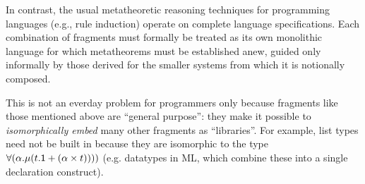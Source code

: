 \documentclass[10pt,preprint]{sigplanconf}
\begin{document}
In contrast, the usual metatheoretic reasoning techniques for programming languages  (e.g., rule induction) operate on complete language specifications. Each {combination} of fragments must formally be treated as its own monolithic language for which  metatheorems must be established anew, guided only informally by those derived for the smaller systems from which it is notionally composed.


This is not an everday problem for programmers only because fragments like those mentioned above are ``general purpose'': they make it possible to \emph{isomorphically embed}  many other fragments as ``libraries''. For example, list types need not be built in because they are isomorphic to the type $\forall(\alpha.\mu(t.{\sf 1} + (\alpha \times t))))$ (e.g. datatypes in ML, which combine these into a single declaration construct). %
\end{document}
